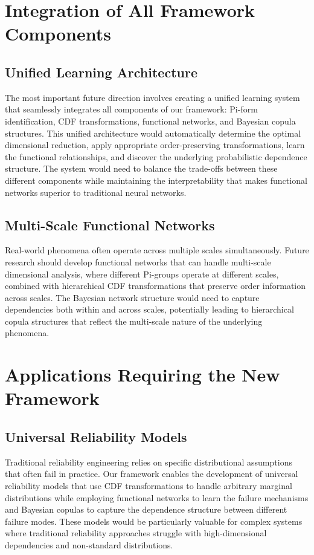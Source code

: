 \documentclass[
	11pt, %
	fleqn, %
	a4paper, %
]{LegrandOrangeBook}
\begin{document}
\section{Integration of All Framework Components}
\subsection{Unified Learning Architecture}
The most important future direction involves creating a unified learning system that seamlessly integrates all components of our framework: Pi-form identification, CDF transformations, functional networks, and Bayesian copula structures.
This unified architecture would automatically determine the optimal dimensional reduction, apply appropriate order-preserving transformations, learn the functional relationships, and discover the underlying probabilistic dependence structure. The system would need to balance the trade-offs between these different components while maintaining the interpretability that makes functional networks superior to traditional neural networks.

\subsection{Multi-Scale Functional Networks}
Real-world phenomena often operate across multiple scales simultaneously. Future research should develop functional networks that can handle multi-scale dimensional analysis, where different Pi-groups operate at different scales, combined with hierarchical CDF transformations that preserve order information across scales.
The Bayesian network structure would need to capture dependencies both within and across scales, potentially leading to hierarchical copula structures that reflect the multi-scale nature of the underlying phenomena.

\section{Applications Requiring the New Framework}
\subsection{Universal Reliability Models}
Traditional reliability engineering relies on specific distributional assumptions that often fail in practice. Our framework enables the development of universal reliability models that use CDF transformations to handle arbitrary marginal distributions while employing functional networks to learn the failure mechanisms and Bayesian copulas to capture the dependence structure between different failure modes.
These models would be particularly valuable for complex systems where traditional reliability approaches struggle with high-dimensional dependencies and non-standard distributions.
\end{document}
